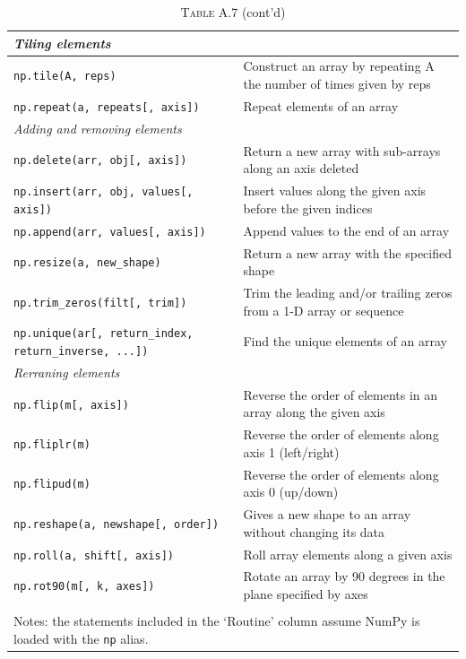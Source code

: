 \documentclass[a4paper,11pt]{book}
\begin{document}
\begin{appendices}
\begin{table}
	\centering
	\caption*{\textsc{Table A.7} (cont'd)}
	\begin{tabular}{p{7.5cm}p{13cm}}
		\midrule
		\multicolumn{1}{l}{\textit{Tiling elements}} \\ 
		\midrule
		\texttt{np.tile(A, reps)} & 
                Construct an array by repeating A the number of times given by reps\\
                \texttt{np.repeat(a, repeats[, axis])} & 
                Repeat elements of an array\\
		\midrule
		\multicolumn{1}{l}{\textit{Adding and removing elements}} \\
		\midrule
		\texttt{np.delete(arr, obj[, axis])} &
                Return a new array with sub-arrays along an axis deleted\\
                \texttt{np.insert(arr, obj, values[, axis])} &
                Insert values along the given axis before the given indices\\
               \texttt{np.append(arr, values[, axis])} &
                Append values to the end of an array\\
                \texttt{np.resize(a, new\_shape)} &
                Return a new array with the specified shape\\
                \texttt{np.trim\_zeros(filt[, trim])} &
                Trim the leading and/or trailing zeros from a 1-D array or sequence\\
                \texttt{np.unique(ar[, return\_index, return\_inverse, ...])} &
                Find the unique elements of an array\\
		\midrule
		\multicolumn{1}{l}{\textit{Rerraning elements}} \\
         	\midrule
		\texttt{np.flip(m[, axis])} &
                Reverse the order of elements in an array along the given axis\\
                \texttt{np.fliplr(m)} &
                Reverse the order of elements along axis 1 (left/right)\\
                \texttt{np.flipud(m)} &
                Reverse the order of elements along axis 0 (up/down)\\
                \texttt{np.reshape(a, newshape[, order])} &
                Gives a new shape to an array without changing its data\\
                \texttt{np.roll(a, shift[, axis])} &
                Roll array elements along a given axis\\
                \texttt{np.rot90(m[, k, axes])} &
                Rotate an array by 90 degrees in the plane specified by axes\\
		\bottomrule \\[-1.8ex]
	        \multicolumn{2}{l}{Notes: the statements included in the `Routine' column assume NumPy is loaded with the \texttt{np} alias.} \\
	\end{tabular}
\end{table}
\clearpage


\end{appendices}
\end{document}
